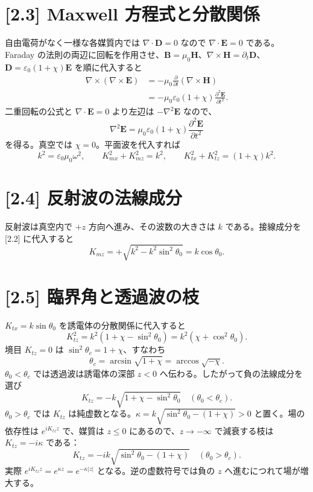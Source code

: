 \documentclass[11pt,a4paper]{article}
\begin{document}
\section*{[2.3] Maxwell 方程式と分散関係}
自由電荷がなく一様な各媒質内では $\nabla\cdot\boldsymbol D=0$ なので $\nabla\cdot\boldsymbol E=0$ である。Faraday の法則の両辺に回転を作用させ、$\boldsymbol B=\mu_0\boldsymbol H$、$\nabla\times\boldsymbol H=\partial_t\boldsymbol D$、$\boldsymbol D=\varepsilon_0(1+\chi)\boldsymbol E$ を順に代入すると
\begin{align*}
 \nabla\times(\nabla\times\boldsymbol E)
 &=-\mu_0\frac{\partial}{\partial t}(\nabla\times\boldsymbol H)\\
 &=-\mu_0\varepsilon_0(1+\chi)\frac{\partial^2\boldsymbol E}{\partial t^2}.
\end{align*}
二重回転の公式と $\nabla\cdot\boldsymbol E=0$ より左辺は $-\nabla^2\boldsymbol E$ なので、
\[
\nabla^2\boldsymbol E=\mu_0\varepsilon_0(1+\chi)\frac{\partial^2\boldsymbol E}{\partial t^2}
\]
を得る。真空では $\chi=0$。平面波を代入すれば
\[
\boxed{k^2=\varepsilon_0\mu_0\omega^2},\qquad
\boxed{K_{mx}^2+K_{mz}^2=k^2},\qquad
\boxed{K_{tx}^2+K_{tz}^2=(1+\chi)k^2}.
\]

\section*{[2.4] 反射波の法線成分}
反射波は真空内で $+z$ 方向へ進み、その波数の大きさは $k$ である。接線成分を [2.2] に代入すると
\[
K_{mz}=+\sqrt{k^2-k^2\sin^2\theta_0}
=\boxed{k\cos\theta_0}.
\]

\section*{[2.5] 臨界角と透過波の枝}
$K_{tx}=k\sin\theta_0$ を誘電体の分散関係に代入すると
\[
K_{tz}^2=k^2(1+\chi-\sin^2\theta_0)=k^2(\chi+\cos^2\theta_0).
\]
境目 $K_{tz}=0$ は $\sin^2\theta_c=1+\chi$、すなわち
\[
\boxed{\theta_c=\arcsin\sqrt{1+\chi}=\arccos\sqrt{-\chi}}.
\]
$\theta_0<\theta_c$ では透過波は誘電体の深部 $z<0$ へ伝わる。したがって負の法線成分を選び
\[
\boxed{K_{tz}=-k\sqrt{1+\chi-\sin^2\theta_0}\quad (\theta_0<\theta_c)}.
\]
$\theta_0>\theta_c$ では $K_{tz}$ は純虚数となる。$\kappa=k\sqrt{\sin^2\theta_0-(1+\chi)}>0$ と置く。場の依存性は $e^{iK_{tz}z}$ で、媒質は $z\le0$ にあるので、$z\to-\infty$ で減衰する枝は $K_{tz}=-i\kappa$ である：
\[
\boxed{K_{tz}=-ik\sqrt{\sin^2\theta_0-(1+\chi)}\quad (\theta_0>\theta_c)}.
\]
実際 $e^{iK_{tz}z}=e^{\kappa z}=e^{-\kappa|z|}$ となる。逆の虚数符号では負の $z$ へ進むにつれて場が増大する。
\end{document}
